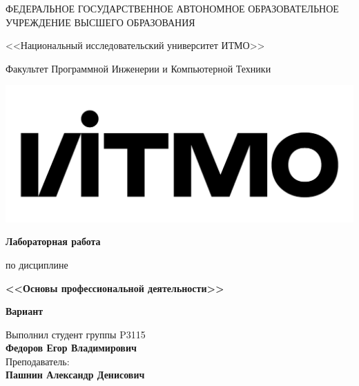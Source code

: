 \begin{titlepage}
    \thispagestyle{firststyle}
    \begin{center}

       ФЕДЕРАЛЬНОЕ ГОСУДАРСТВЕННОЕ АВТОНОМНОЕ ОБРАЗОВАТЕЛЬНОЕ УЧРЕЖДЕНИЕ ВЫСШЕГО ОБРАЗОВАНИЯ
        \vspace{0.5cm}

        <<Национальный исследовательский университет ИТМО>>

        Факультет Программной Инженерии и Компьютерной Техники

        \vspace{1cm}


        \includegraphics[scale=0.1]{img/itmo_logo.png}

    \end{center}

    \vspace{1cm}

    \begin{center}
        \large
        \textbf{Лабораторная работа }

        по дисциплине
        
        \textbf{<<Основы профессиональной деятельности>>}

        \textbf{Вариант }
    \end{center}

    \vspace{2cm}

    \begin{flushright}
        Выполнил студент  группы P3115\\
        \textbf{Федоров Егор Владимирович} \\
        Преподаватель: \\
        \textbf{Пашнин Александр Денисович}\\
    \end{flushright}

\end{titlepage}